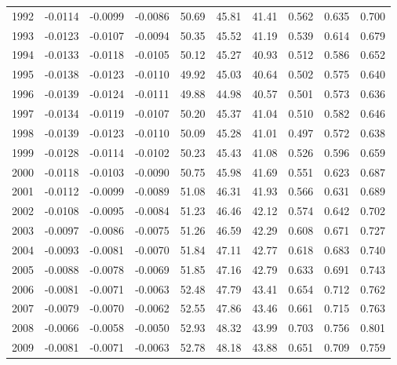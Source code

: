 \begin{tabular}{cccccccccc}
  1992 & -0.0114 & -0.0099 & -0.0086 & 50.69 & 45.81 & 41.41 & 0.562 & 0.635 & 0.700 \\ 
  1993 & -0.0123 & -0.0107 & -0.0094 & 50.35 & 45.52 & 41.19 & 0.539 & 0.614 & 0.679 \\ 
  1994 & -0.0133 & -0.0118 & -0.0105 & 50.12 & 45.27 & 40.93 & 0.512 & 0.586 & 0.652 \\ 
  1995 & -0.0138 & -0.0123 & -0.0110 & 49.92 & 45.03 & 40.64 & 0.502 & 0.575 & 0.640 \\ 
  1996 & -0.0139 & -0.0124 & -0.0111 & 49.88 & 44.98 & 40.57 & 0.501 & 0.573 & 0.636 \\ 
  1997 & -0.0134 & -0.0119 & -0.0107 & 50.20 & 45.37 & 41.04 & 0.510 & 0.582 & 0.646 \\ 
  1998 & -0.0139 & -0.0123 & -0.0110 & 50.09 & 45.28 & 41.01 & 0.497 & 0.572 & 0.638 \\ 
  1999 & -0.0128 & -0.0114 & -0.0102 & 50.23 & 45.43 & 41.08 & 0.526 & 0.596 & 0.659 \\ 
  2000 & -0.0118 & -0.0103 & -0.0090 & 50.75 & 45.98 & 41.69 & 0.551 & 0.623 & 0.687 \\ 
  2001 & -0.0112 & -0.0099 & -0.0089 & 51.08 & 46.31 & 41.93 & 0.566 & 0.631 & 0.689 \\ 
  2002 & -0.0108 & -0.0095 & -0.0084 & 51.23 & 46.46 & 42.12 & 0.574 & 0.642 & 0.702 \\ 
  2003 & -0.0097 & -0.0086 & -0.0075 & 51.26 & 46.59 & 42.29 & 0.608 & 0.671 & 0.727 \\ 
  2004 & -0.0093 & -0.0081 & -0.0070 & 51.84 & 47.11 & 42.77 & 0.618 & 0.683 & 0.740 \\ 
  2005 & -0.0088 & -0.0078 & -0.0069 & 51.85 & 47.16 & 42.79 & 0.633 & 0.691 & 0.743 \\ 
  2006 & -0.0081 & -0.0071 & -0.0063 & 52.48 & 47.79 & 43.41 & 0.654 & 0.712 & 0.762 \\ 
  2007 & -0.0079 & -0.0070 & -0.0062 & 52.55 & 47.86 & 43.46 & 0.661 & 0.715 & 0.763 \\ 
  2008 & -0.0066 & -0.0058 & -0.0050 & 52.93 & 48.32 & 43.99 & 0.703 & 0.756 & 0.801 \\ 
  2009 & -0.0081 & -0.0071 & -0.0063 & 52.78 & 48.18 & 43.88 & 0.651 & 0.709 & 0.759 \\ 
   \hline
\end{tabular}
